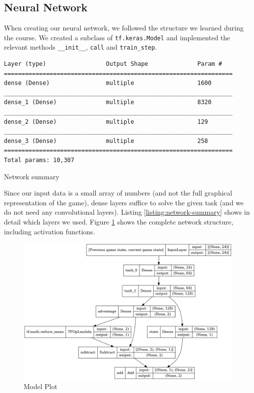 

\subsection{Neural Network}

When creating our neural network, we followed the structure we learned during the course. We created a subclass of \texttt{tf.keras.Model} and implemented the relevant methods \texttt{__init__}, \texttt{call} and \texttt{train_step}. 
\begin{listing}[!ht]
\begin{verbatim}
Layer (type)                 Output Shape              Param #   
=================================================================
dense (Dense)                multiple                  1600      
_________________________________________________________________
dense_1 (Dense)              multiple                  8320      
_________________________________________________________________
dense_2 (Dense)              multiple                  129       
_________________________________________________________________
dense_3 (Dense)              multiple                  258       
=================================================================
Total params: 10,307
\end{verbatim}
\caption{Network summary}
\label{listing:network-summary}
\end{listing}

Since our input data is a small array of numbers (and not the full graphical representation of the game), dense layers suffice to solve the given task (and we do not need any convolutional layers). Listing \ref{listing:network-summary} shows in detail which layers we used. Figure \ref{fig:model-plot} shows the complete network structure, including activation functions.

\begin{figure}
    \centering
    \includegraphics[width=\textwidth]{media/modelPlot.png}
    \caption{Model Plot}
    \label{fig:model-plot}
\end{figure}
